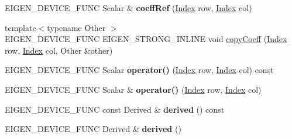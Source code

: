 \begin{DoxyCompactItemize}
\item 
\mbox{\label{class_eigen_1_1_triangular_base_a2a82bec3d60e607e16ad628112d97958}} 
E\+I\+G\+E\+N\+\_\+\+D\+E\+V\+I\+C\+E\+\_\+\+F\+U\+NC Scalar \& {\bfseries coeff\+Ref} (\mbox{\hyperlink{struct_eigen_1_1_eigen_base_a554f30542cc2316add4b1ea0a492ff02}{Index}} row, \mbox{\hyperlink{struct_eigen_1_1_eigen_base_a554f30542cc2316add4b1ea0a492ff02}{Index}} col)
\item 
{\footnotesize template$<$typename Other $>$ }\\E\+I\+G\+E\+N\+\_\+\+D\+E\+V\+I\+C\+E\+\_\+\+F\+U\+NC E\+I\+G\+E\+N\+\_\+\+S\+T\+R\+O\+N\+G\+\_\+\+I\+N\+L\+I\+NE void \mbox{\hyperlink{class_eigen_1_1_triangular_base_ae93491f8454e133ff48202bf7c0c59e7}{copy\+Coeff}} (\mbox{\hyperlink{struct_eigen_1_1_eigen_base_a554f30542cc2316add4b1ea0a492ff02}{Index}} row, \mbox{\hyperlink{struct_eigen_1_1_eigen_base_a554f30542cc2316add4b1ea0a492ff02}{Index}} col, Other \&other)
\item 
\mbox{\label{class_eigen_1_1_triangular_base_a66a213e5e80f7a1274075fd96df2bcc6}} 
E\+I\+G\+E\+N\+\_\+\+D\+E\+V\+I\+C\+E\+\_\+\+F\+U\+NC Scalar {\bfseries operator()} (\mbox{\hyperlink{struct_eigen_1_1_eigen_base_a554f30542cc2316add4b1ea0a492ff02}{Index}} row, \mbox{\hyperlink{struct_eigen_1_1_eigen_base_a554f30542cc2316add4b1ea0a492ff02}{Index}} col) const
\item 
\mbox{\label{class_eigen_1_1_triangular_base_afd64351e253d77fe5fc57bf1e3bd2c45}} 
E\+I\+G\+E\+N\+\_\+\+D\+E\+V\+I\+C\+E\+\_\+\+F\+U\+NC Scalar \& {\bfseries operator()} (\mbox{\hyperlink{struct_eigen_1_1_eigen_base_a554f30542cc2316add4b1ea0a492ff02}{Index}} row, \mbox{\hyperlink{struct_eigen_1_1_eigen_base_a554f30542cc2316add4b1ea0a492ff02}{Index}} col)
\item 
\mbox{\label{class_eigen_1_1_triangular_base_a0bde7bb684256ff85527f5cf606f3de8}} 
E\+I\+G\+E\+N\+\_\+\+D\+E\+V\+I\+C\+E\+\_\+\+F\+U\+NC const Derived \& {\bfseries derived} () const
\item 
\mbox{\label{class_eigen_1_1_triangular_base_ac5f8c093e6639aed751c81e1bcac8504}} 
E\+I\+G\+E\+N\+\_\+\+D\+E\+V\+I\+C\+E\+\_\+\+F\+U\+NC Derived \& {\bfseries derived} ()

\end{DoxyCompactItemize}

